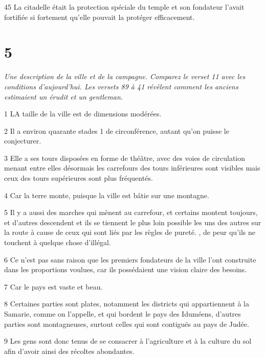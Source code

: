\par 45 La citadelle était la protection spéciale du temple et son fondateur l'avait fortifiée si fortement qu'elle pouvait la protéger efficacement.

\chapter{5}

\par \textit{Une description de la ville et de la campagne. Comparez le verset 11 avec les conditions d’aujourd’hui. Les versets 89 à 41 révèlent comment les anciens estimaient un érudit et un gentleman.}

\par 1 LA taille de la ville est de dimensions modérées.

\par 2 Il a environ quarante stades 1 de circonférence, autant qu'on puisse le conjecturer.

\par 3 Elle a ses tours disposées en forme de théâtre, avec des voies de circulation menant entre elles désormais les carrefours des tours inférieures sont visibles mais ceux des tours supérieures sont plus fréquentés.

\par 4 Car la terre monte, puisque la ville est bâtie sur une montagne.

\par 5 Il y a aussi des marches qui mènent au carrefour, et certains montent toujours, et d'autres descendent et ils se tiennent le plus loin possible les uns des autres sur la route à cause de ceux qui sont liés par les règles de pureté. , de peur qu’ils ne touchent à quelque chose d’illégal.

\par 6 Ce n'est pas sans raison que les premiers fondateurs de la ville l'ont construite dans les proportions voulues, car ils possédaient une vision claire des besoins.

\par 7 Car le pays est vaste et beau.

\par 8 Certaines parties sont plates, notamment les districts qui appartiennent à la Samarie, comme on l'appelle, et qui bordent le pays des Iduméens, d'autres parties sont montagneuses, surtout celles qui sont contiguës au pays de Judée.

\par 9 Les gens sont donc tenus de se consacrer à l'agriculture et à la culture du sol afin d'avoir ainsi des récoltes abondantes.

